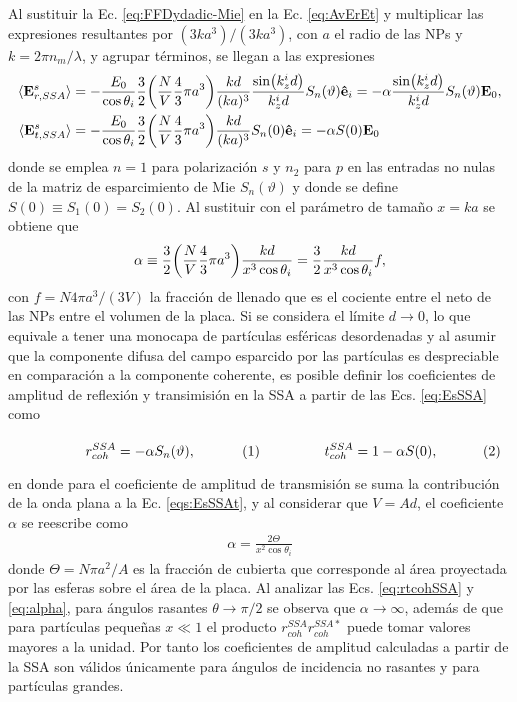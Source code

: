 Al sustituir la Ec. \eqref{eq:FFDydadic-Mie} en la Ec. \eqref{eq:AvErEt} y multiplicar las expresiones resultantes por $(3ka^3)/(3ka^3)$, con $a$ el radio de las NPs y $k = 2\pi n_m /\lambda$, y agrupar términos, se llegan a las expresiones 
	\begin{subequations}\begin{align}
		\langle \vb{E}^s_{r,SSA}\rangle & = - \frac{E_0}{\cos\theta_i} \frac32  \qty(\frac{N}{V} \frac43\pi a^3)\frac{kd}{(ka)^3}   \frac{\sin(k_z^id)}{k_z^i d}  S_n(\vartheta)\vu{e}_i =
		-\alpha  \frac{\sin(k_z^id)}{k_z^i d}   S_n(\vartheta) \vb{E}_0,
		\label{eqs:EsSSAr}\\
	\langle \vb{E}^s_{t,SSA}\rangle &=  - \frac{E_0}{\cos\theta_i} \frac32
						 \qty(\frac{N}{V}\frac43\pi a^3  ) \frac{kd}{(ka)^3}  S_n(0) \vu{e}_i  
						 = - \alpha S(0) \vb{E}_0
		\label{eqs:EsSSAt}
	\end{align}\label{eq:EsSSA}\end{subequations}
donde  se emplea $n=1$ para polarización $s$ y $n_2$ para $p$ en las entradas no nulas de la matriz de esparcimiento de Mie $S_n(\vartheta)$ y donde se define $S(0) \equiv S_1(0)=S_2(0)$. Al sustituir con el parámetro de tamaño $x=ka$ se obtiene que  
\begin{align*}
	\alpha \equiv \frac32 \qty(\frac{N}{V}\frac43 \pi a^3  )\frac{kd}{x^3\cos\theta_i} = \frac32\frac{kd}{ x^3\cos\theta_i} f,
	\end{align*}
con $f= N 4\pi a^3/(3V)$ la fracción de llenado que es el cociente entre el neto de las NPs entre el volumen de la placa. Si se considera el límite $d\to 0$, lo que equivale a tener una monocapa de partículas esféricas desordenadas y al asumir que la componente difusa del campo esparcido por las partículas es despreciable en comparación a la componente coherente, es posible definir los coeficientes de amplitud de reflexión y transimisión en la SSA a partir de las Ecs. \eqref{eq:EsSSA} como \vspace*{-.5em}	
	
	\begin{subequations}\eqhalf{r_{coh}^{SSA} = -\alpha S_n(\vartheta),}
	\eqhalf{t_{coh}^{SSA} = 1 - \alpha S(0), }
	\label{eq:rtcohSSA}\end{subequations}\vspace*{-.5em}	
	
\noindent en donde para el coeficiente de amplitud de transmisión se suma la contribución de la onda plana a la Ec. \eqref{eqs:EsSSAt}, y al considerar que $V = A d$, el coeficiente $\alpha$ se reescribe como
	\begin{align}
	\alpha = \frac{2\Theta}{x^2 \cos\theta_i}
	\label{eq:alpha}
	\end{align}
donde $\Theta = N \pi a^2 / A$ es la fracción de cubierta que corresponde al área proyectada por las esferas sobre el área de la placa. Al analizar  las Ecs. \eqref{eq:rtcohSSA} y \eqref{eq:alpha}, para ángulos rasantes $\theta\to \pi/2$ se observa que $\alpha\to \infty$, además de que para partículas pequeñas $x\ll 1$ el producto $r_{coh}^{SSA}r_{coh}^{SSA*}$ puede tomar valores mayores a la unidad. Por tanto los coeficientes de amplitud calculadas a partir de la SSA son válidos únicamente para ángulos de incidencia no rasantes y para partículas grandes. 

